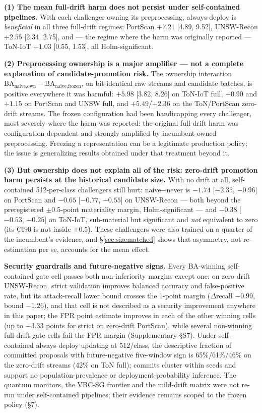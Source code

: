 \documentclass[journal]{IEEEtran}
\begin{document}
\textbf{(1) The mean full-drift harm does not persist under self-contained pipelines.} With each challenger owning its preprocessing, always-deploy is \emph{beneficial} in all three full-drift regimes: PortScan $+7.21$ [4.89, 9.52], UNSW-Recon $+2.55$ [2.34, 2.75], and --- the regime where the harm was originally reported --- ToN-IoT $+1.03$ [0.55, 1.53], all Holm-significant.

\textbf{(2) Preprocessing ownership is a major amplifier --- not a complete explanation of candidate-promotion risk.} The ownership interaction $\mathrm{BA}_{\text{naive,own}} - \mathrm{BA}_{\text{naive,frozen}}$, on bit-identical raw streams and candidate batches, is positive everywhere it was harmful: $+5.98$ [3.82, 8.26] on ToN-IoT full, $+0.90$ and $+1.15$ on PortScan and UNSW full, and $+5.49$/$+2.36$ on the ToN/PortScan zero-drift streams. The frozen configuration had been handicapping every challenger, most severely where the harm was reported: the original full-drift harm was configuration-dependent and strongly amplified by incumbent-owned preprocessing. Freezing a representation can be a legitimate production policy; the issue is generalizing results obtained under that treatment beyond it.

\textbf{(3) But ownership does not explain all of the risk: zero-drift promotion harm persists at the historical candidate size.} With no drift at all, self-contained 512-per-class challengers still hurt: naive$-$never is $-1.74$ [$-2.35$, $-0.96$] on PortScan and $-0.65$ [$-0.77$, $-0.55$] on UNSW-Recon --- both beyond the preregistered $\pm0.5$-point materiality margin, Holm-significant --- and $-0.38$ [$-0.53$, $-0.25$] on ToN-IoT, sub-material but significant and \emph{not} equivalent to zero (its CI90 is not inside $\pm0.5$). These challengers were also trained on a quarter of the incumbent's evidence, and \S\ref{sec:sizematched} shows that asymmetry, not re-estimation per se, accounts for the mean effect.



\textbf{Security guardrails and future-negative signs.} Every BA-winning self-contained gate cell passes both non-inferiority margins except one: on zero-drift UNSW-Recon, strict validation improves balanced accuracy and false-positive rate, but its attack-recall lower bound crosses the 1-point margin ($\Delta$recall $-0.99$, bound $-1.26$), and that cell is not described as a security improvement anywhere in this paper; the FPR point estimate improves in each of the other winning cells (up to $-3.33$ points for strict on zero-drift PortScan), while several non-winning full-drift gate cells fail the FPR margin (Supplementary \S S7). Under self-contained always-deploy updating at 512/class, the descriptive fraction of committed proposals with future-negative five-window sign is 65\%/61\%/46\% on the zero-drift streams (42\% on ToN full); commits cluster within seeds and support no population-prevalence or deployment-probability inference. The quantum monitors, the VBC-SG frontier and the mild-drift matrix were not re-run under self-contained pipelines; their evidence remains scoped to the frozen policy (\S7).
\end{document}
